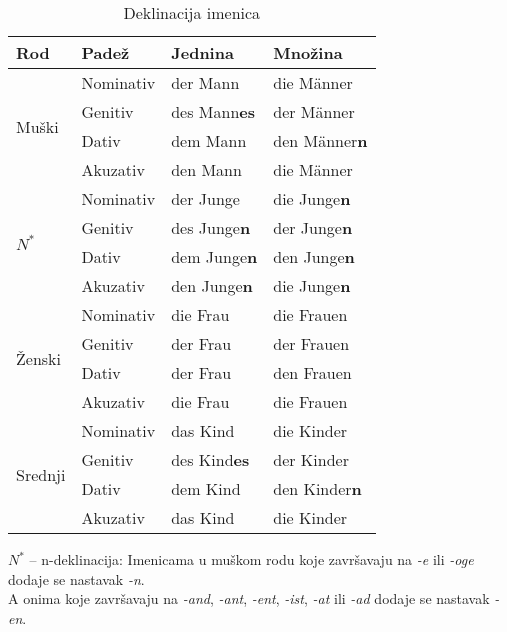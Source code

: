 \documentclass[12pt,german]{article}
\newcommand{\nastavak}[1]{\emph{-#1}}
\begin{document}
\begin{multicols}{2}
\begin{table}[H]
\caption{Deklinacija imenica}
\begin{tabular}{@{} llll @{}}
\toprule
Rod & Padež & Jednina & Množina \\
\midrule
\multirow{4}{3mm}{\begin{sideways}\parbox{12mm}{Muški}\end{sideways}}
& Nominativ & der Mann      & die M\"anner       \\
& Genitiv & des Mann\bf{es} & der M\"anner       \\
& Dativ & dem Mann          & den M\"anner\bf{n} \\
& Akuzativ & den Mann       & die M\"anner       \\
\midrule
  \multirow{4}{3mm}{\begin{sideways}\parbox{5mm}{$N^\ast$}\end{sideways}}
& Nominativ & der Junge      & die Junge\bf{n} \\
& Genitiv & des Junge\bf{n}  & der Junge\bf{n} \\
& Dativ & dem Junge\bf{n}    & den Junge\bf{n} \\
& Akuzativ & den Junge\bf{n} & die Junge\bf{n} \\
\midrule
\multirow{4}{3mm}{\begin{sideways}\parbox{12mm}{Ženski}\end{sideways}}
& Nominativ & die Frau & die Frauen \\
& Genitiv & der Frau   & der Frauen \\
& Dativ & der Frau     & den Frauen \\
& Akuzativ & die Frau  & die Frauen \\
\midrule
\multirow{4}{3mm}{\begin{sideways}\parbox{15mm}{Srednji}\end{sideways}}
& Nominativ & das Kind      & die Kinder \\
& Genitiv & des Kind\bf{es} & der Kinder \\
& Dativ & dem Kind          & den Kinder\bf{n} \\
& Akuzativ & das Kind       & die Kinder \\
\bottomrule
\end{tabular}
\begin{tablenotes}
  \small
\item $N^\ast$ -- n-deklinacija: Imenicama u muškom rodu koje završavaju na \nastavak{e}
    ili \nastavak{oge} dodaje se nastavak \nastavak{n}.\\
    A onima koje završavaju na \nastavak{and}, \nastavak{ant}, \nastavak{ent},
    \nastavak{ist}, \nastavak{at} ili \nastavak{ad} dodaje se nastavak
    \nastavak{en}.
\end{tablenotes}
\end{table}


\end{multicols}
\end{document}
